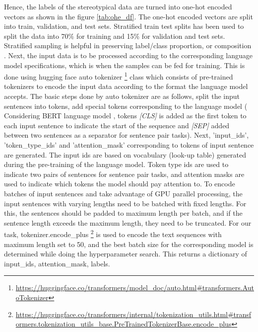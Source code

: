 Hence, the labels of the stereotypical data are turned into one-hot encoded vectors as shown in the figure \ref{tab:ohe_df}. The one-hot encoded vectors are split into train, validation, and test sets. Stratified train test splits has been used to split the data into 70\% for training and 15\% for validation and test sets. Stratified sampling is helpful in preserving label/class proportion, or composition \cite{merrillees2021stratified}. Next, the input data is to be processed according to the corresponding language model specifications, which is when the samples can be fed for training. This is done using hugging face auto tokenizer \footnote{\url{https://huggingface.co/transformers/model_doc/auto.html#transformers.AutoTokenizer}} class which consists of pre-trained tokenizers to encode the input data according to the format the language model accepts. The basic steps done by auto tokenizer are as follows, split the input sentences into tokens, add special tokens corresponding to the language model ( Considering BERT language model \cite{devlin2018bert}, tokens \textit{[CLS]} is added as the first token to each input sentence to indicate the start of the sequence and \textit{[SEP]} added between two sentences as a separator for sentence pair tasks). Next, 'input\_ids', 'token\_type\_ids' and 'attention\_mask' corresponding to tokens of input sentence are generated. The input ids are based on vocabulary (look-up table) generated during the pre-training of the language model. Token type ids are used to indicate two pairs of sentences for sentence pair tasks, and attention masks are used to indicate which tokens the model should pay attention to.  To encode batches of input sentences and take advantage of GPU parallel processing, the input sentences with varying lengths need to be batched with fixed lengths. For this, the sentences should be padded to maximum length per batch, and if the sentence length exceeds the maximum length, they need to be truncated. For our task, tokenizer.encode\_plus \footnote{\url{https://huggingface.co/transformers/internal/tokenization_utils.html#transformers.tokenization_utils_base.PreTrainedTokenizerBase.encode_plus}} is used to encode the text sequences with maximum length set to 50, and the best batch size for the corresponding model is determined while doing the hyperparameter search. This returns a dictionary of input\_ids, attention\_mask, labels. 

